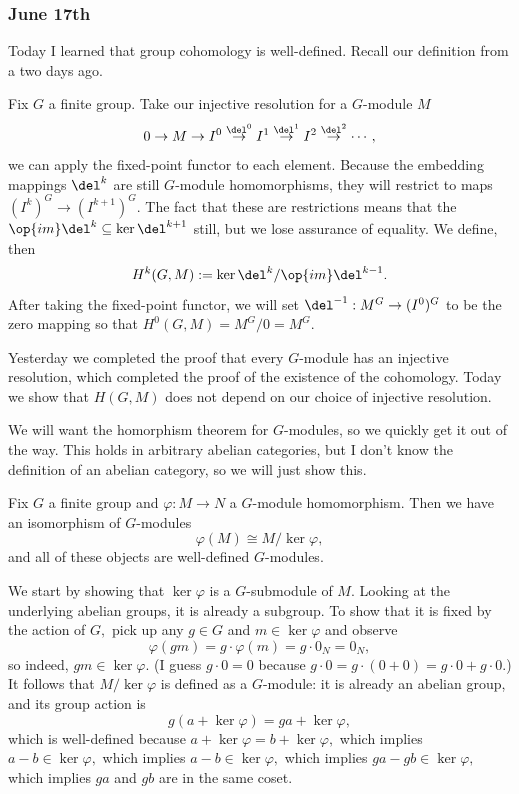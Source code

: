 \subsubsection{June 17th}
Today I learned that group cohomology is well-defined. Recall our definition from a two days ago.
\begin{definition}
    Fix $G$ a finite group. Take our injective resolution for a $G$-module $M$
    \[0\to M\to I^0\stackrel{\del^0}\to I^1\stackrel{\del^1}\to I^2\stackrel{\del^2}\to\cdots,\]
    we can apply the fixed-point functor to each element. Because the embedding mappings $\del^k$ are still $G$-module homomorphisms, they will restrict to maps $\left(I^k\right)^G\to\left(I^{k+1}\right)^G.$ The fact that these are restrictions means that the $\op{im}\del^k\subseteq\ker\del^{k+1}$ still, but we lose assurance of equality. We define, then
    \[H^k(G,M):=\ker\del^k/\op{im}\del^{k-1}.\]
    After taking the fixed-point functor, we will set $\del^{-1}:M^G\to(I^0)^G$ to be the zero mapping so that $H^0(G,M)=M^G/0=M^G.$
\end{definition}
Yesterday we completed the proof that every $G$-module has an injective resolution, which completed the proof of the existence of the cohomology. Today we show that $H(G,M)$ does not depend on our choice of injective resolution.

We will want the homorphism theorem for $G$-modules, so we quickly get it out of the way. This holds in arbitrary abelian categories, but I don't know the definition of an abelian category, so we will just show this.
\begin{lemma}
    Fix $G$ a finite group and $\varphi:M\to N$ a $G$-module homomorphism. Then we have an isomorphism of $G$-modules
    \[\varphi(M)\cong M/\ker\varphi,\]
    and all of these objects are well-defined $G$-modules.
\end{lemma}
We start by showing that $\ker\varphi$ is a $G$-submodule of $M.$ Looking at the underlying abelian groups, it is already a subgroup. To show that it is fixed by the action of $G,$ pick up any $g\in G$ and $m\in\ker\varphi$ and observe
\[\varphi(gm)=g\cdot\varphi(m)=g\cdot 0_N=0_N,\]
so indeed, $gm\in\ker\varphi.$ (I guess $g\cdot0=0$ because $g\cdot0=g\cdot(0+0)=g\cdot0+g\cdot0.$) It follows that $M/\ker\varphi$ is defined as a $G$-module: it is already an abelian group, and its group action is
\[g\left(a+\ker\varphi\right)=ga+\ker\varphi,\]
which is well-defined because $a+\ker\varphi=b+\ker\varphi,$ which implies $a-b\in\ker\varphi,$ which implies $a-b\in\ker\varphi,$ which implies $ga-gb\in\ker\varphi,$ which implies $ga$ and $gb$ are in the same coset.

